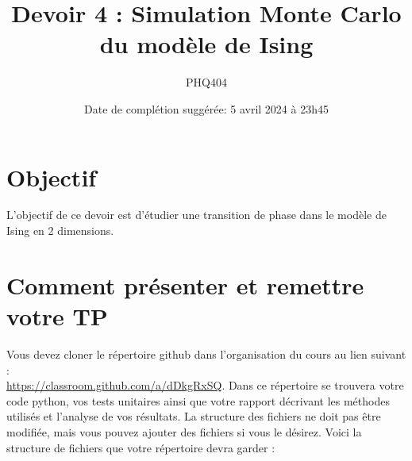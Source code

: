 \documentclass[12pt, letterpaper]{article}
\numberwithin{table}{section}
\numberwithin{figure}{section}
\numberwithin{equation}{section}
\begin{document}
\title{Devoir 4 : Simulation Monte Carlo du modèle de Ising}
\author{PHQ404}
\date{Date de complétion suggérée: 5 avril 2024 à 23h45}
\maketitle

\section{Objectif}\label{sec:objectif}

\noindent L'objectif de ce devoir est d'étudier une transition de phase
dans le modèle de Ising en 2 dimensions.


\section{Comment présenter et remettre votre TP}\label{sec:comment-presenter-et-remettre-votre-tp}

\noindent Vous devez cloner le répertoire github dans l'organisation du cours au lien suivant :\\
\href{https://classroom.github.com/a/dDkgRxSQ}{https://classroom.github.com/a/dDkgRxSQ}.
Dans ce répertoire se trouvera votre code python, vos tests unitaires ainsi que votre rapport
décrivant les méthodes utilisés et l'analyse de vos résultats.
La structure des fichiers ne doit pas être modifiée, mais vous pouvez ajouter des fichiers si vous le désirez.
Voici la structure de fichiers que votre répertoire devra garder :

\bigskip
\end{document}
